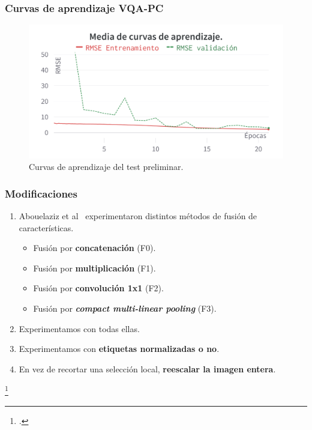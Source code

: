 \begin{frame}
  \frametitle{Curvas de aprendizaje VQA-PC}
  \vspace{-.2cm}
\begin{figure}[htp]
  \centering
    \includegraphics[width=.75\textwidth]{imagenes/chapter4/PreTestCurves.png}
  \caption[Curvas de aprendizaje del test preliminar.]{
    Curvas de aprendizaje del test preliminar. 
  } 
\label{fig:PreTestCurves}
\end{figure}
\end{frame}

\begin{frame}
  \frametitle{Modificaciones}
  \begin{enumerate}
    \item Abouelaziz et al\footnotemark~ experimentaron \alert{distintos métodos de fusión de características}.
      \begin{itemize}
        \item Fusión por \textbf{concatenación} (F0).
        \item Fusión por \textbf{multiplicación} (F1). 
        \item Fusión por \textbf{convolución 1x1} (F2).
        \item Fusión por \textbf{\emph{compact multi-linear pooling}} (F3).
      \end{itemize}
    \item Experimentamos con todas ellas.
    \item Experimentamos con \textbf{etiquetas normalizadas o no}.
    \item En vez de recortar una selección local, \textbf{reescalar la imagen entera}.
  \end{enumerate}
  \footcitetext{EnsemblePCQA}
\end{frame}

